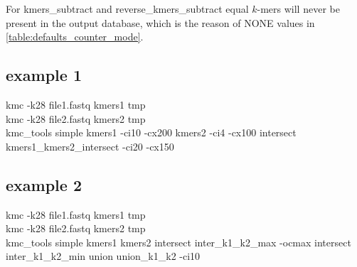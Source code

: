For \textsf{kmers\_subtract} and \textsf{reverse\_kmers\_subtract} equal $k$-mers will never be present in the output database, which is the reason of NONE values in \cref{table:defaults_counter_mode}.

\subsection*{example 1}
kmc -k28 file1.fastq kmers1 tmp \\
kmc -k28 file2.fastq kmers2 tmp \\
kmc\_tools simple kmers1 -ci10 -cx200 kmers2 -ci4 -cx100 intersect kmers1\_kmers2\_intersect -ci20 -cx150 \\

\subsection*{example 2}
kmc -k28 file1.fastq kmers1 tmp \\
kmc -k28 file2.fastq kmers2 tmp \\
kmc\_tools simple kmers1 kmers2 intersect inter\_k1\_k2\_max -ocmax intersect inter\_k1\_k2\_min union union\_k1\_k2 -ci10 
